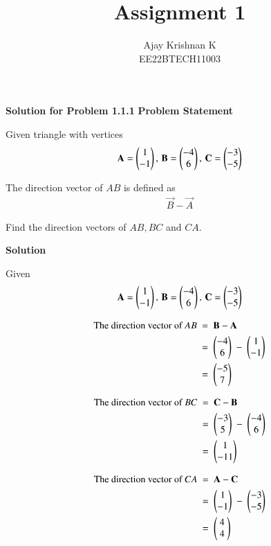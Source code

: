 \documentclass[journal,15pt]{IEEEtran}
\begin{document}
\vspace{3cm}
\author{Ajay Krishnan K\\EE22BTECH11003}

\title{Assignment 1}
\maketitle

\textbf{Solution for Problem 1.1.1}
\bigbreak
\textbf{Problem Statement}

\vspace{5pt}
Given triangle with vertices
\begin{align}
    \label{eq:tri-pts}
    \mathbf{A} = \begin{pmatrix} 1 \\ -1 \end{pmatrix},\,
    \mathbf{B} = \begin{pmatrix}-4 \\ 6\end{pmatrix},\,
    \mathbf{C} = \begin{pmatrix}-3 \\ -5\end{pmatrix}
\end{align}

The direction vector of $AB$ is defined as
\begin{align}
    \vec{B}-
    \vec{A}
\end{align}

Find the direction vectors of $AB, BC$ and $CA$.

\vspace{15pt}
\textbf{Solution}

\vspace{5pt}
Given
\begin{align}
    \mathbf{A} = \begin{pmatrix}1  \\ -1\end{pmatrix},\,
    \mathbf{B} = \begin{pmatrix}-4 \\ 6\end{pmatrix},\,
    \mathbf{C} = \begin{pmatrix}-3 \\ -5\end{pmatrix}
\end{align}

\begin{align}
    \text{The direction vector of $AB$}\ & = \ \vec{B} - \vec{A} \\
                                        & = \ \myvec{-4 \\ 6} \ -\ \myvec{1 \\ -1} \\
                                       \ &= \ \myvec{-5 \\ 7}
\end{align}

\begin{align}
    \text{The direction vector of $BC$}\ & = \ \vec{C} - \vec{B} \\
                                        & = \ \myvec{-3 \\ 5} \ -\ \myvec{-4 \\ 6} \\
                                       \ &= \ \myvec{1 \\ -11}
\end{align}

\begin{align}
    \text{The direction vector of $CA$}\ & = \ \vec{A} - \vec{C} \\
                                        & = \ \myvec{1 \\ -1} \ -\ \myvec{-3 \\ -5} \\
                                       \ &= \ \myvec{\ 4 \ \\ \ 4 \ }
\end{align}
\end{document}
